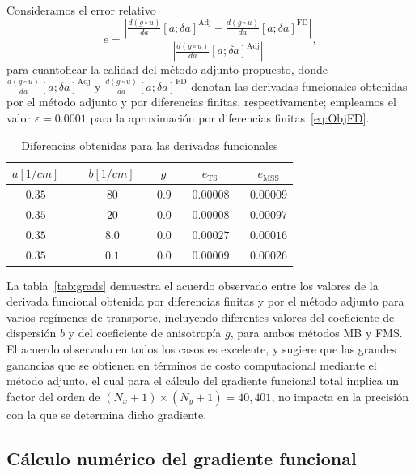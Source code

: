  Consideramos el error relativo
\begin{equation}
 e=\displaystyle \frac{\left|\frac{d (g\circ u)}{da}[a;\delta a]^\mathrm{Adj}- \frac{d (g\circ u)}{da}[a;\delta a]^\mathrm{FD}\right|}{|\frac{d (g\circ u)}{da}[a;\delta a]^\mathrm{Adj}|},
\label{eq:Errgrad}
\end{equation}
para cuantoficar la calidad del método adjunto propuesto, donde
$\frac{d (g\circ u)}{da}[a;\delta a]^\mathrm{Adj}$ y
$\frac{d (g\circ u)}{da}[a;\delta a]^\mathrm{FD}$ denotan 
las derivadas funcionales obtenidas por el método adjunto y por 
diferencias finitas, respectivamente; empleamos el valor $\varepsilon=0.0001$ 
para la aproximación por diferencias finitas~\eqref{eq:ObjFD}.
\begin{table}[h!]
\caption{Diferencias obtenidas para las derivadas funcionales}
\vspace{-0.3cm}
\begin{center}
\begin{tabular}{cccccc}
\hline
$a[1/cm]$ & ~ & $b[1/cm]$ ~ & $g$ ~ & $e_{\text{TS}}$  ~ & $e_{\text{MSS}}$ \\
\hline
$0.35$ & ~ & $80$ ~ &$0.9$ ~ & $0.00008$  ~ & $0.00009$ \\
$0.35$ & ~ & $20$ ~ &$0.0$ ~ & $0.00008$  ~ & $0.00097$ \\
$0.35$ & ~ & $8.0$ ~ &$0.0$ ~ & $0.00027$  ~ & $0.00016$ \\
$0.35$ & ~ & $0.1$ ~ &$0.0$ ~ & $0.00009$  ~ & $0.00026$ \\
\hline
\end{tabular}
\label{tab:grads}
\end{center}
\end{table}
La tabla~\eqref{tab:grads} demuestra el acuerdo observado entre los valores 
de la derivada funcional obtenida por diferencias finitas y por el método adjunto 
para varios regímenes de transporte, incluyendo diferentes valores 
del coeficiente de dispersión $b$ y del coeficiente de anisotropía $g$, 
para ambos métodos MB y FMS. 
El acuerdo observado en todos los casos es excelente, y sugiere que 
las grandes ganancias que se obtienen en términos de costo computacional 
mediante el método adjunto, el cual para el cálculo del gradiente funcional total 
implica un factor del orden de  $(N_x+1) \times (N_y+1) = 40,401$, 
no impacta en la precisión con la que se determina dicho gradiente.

\subsection{Cálculo numérico del gradiente funcional}
\label{sec:gradc}
 
